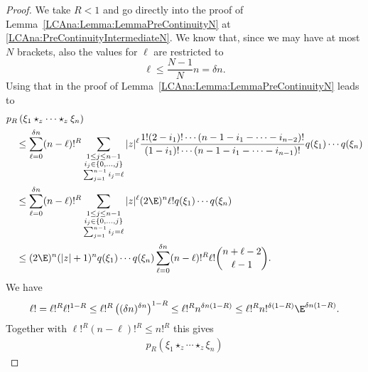 \begin{proof}
    We take $R < 1$ and go directly into the proof of
    Lemma~\ref{LCAna:Lemma:LemmaPreContinuityN} at
    \eqref{LCAna:PreContinuityIntermediateN}. We know that, since we
    may have at most $N$ brackets, also the values for $\ell$ are
    restricted to
    \begin{equation*}
        \ell
        \leq
        \frac{N-1}{N} n
        =
        \delta n.
    \end{equation*}
    Using that in the proof of Lemma~\ref{LCAna:Lemma:LemmaPreContinuityN} 
    leads to
    \begin{align*}
        &p_R \left(
            \xi_1 \star_z \cdots \star_z \xi_n
        \right)
        \\
        &\quad\leq
        \sum\limits_{\ell = 0}^{\delta n}
        (n - \ell)!^R
        \sum\limits_{\substack{
			1 \leq j \leq n-1 \\
			i_j \in \{0, \ldots, j\} \\
			\sum_{j = 1}^{n - 1} i_j = \ell
		}}
        |z|^{\ell}
        \frac{1!  (2 - i_1)! \cdots (n-1 - i_1 - \cdots - i_{n-2})!}
        {(1 - i_1)! \cdots (n-1 - i_1 - \cdots - i_{n-1})!}
        q(\xi_1) \cdots q(\xi_n)
        \\
        &\quad\leq
        \sum\limits_{\ell = 0}^{\delta n}
        (n - \ell)!^R
        \sum\limits_{\substack{
			1 \leq j \leq n-1 \\
			i_j \in \{0, \ldots, j\} \\
			\sum_{j = 1}^{n - 1} i_j = \ell
		}}
        |z|^{\ell} (2 \E)^n \ell!
        q(\xi_1) \cdots q(\xi_n)
        \\
        &\quad\leq
        (2 \E)^n (|z| + 1)^n
        q(\xi_1) \cdots q(\xi_n)
        \sum\limits_{\ell = 0}^{\delta n}
        (n - \ell)!^R \ell!
        \binom{n + \ell - 2}{\ell - 1}.
    \end{align*}
    We have
    \begin{equation*}
        \ell!
        =
        \ell!^R
        \ell!^{1-R}
        \leq
        \ell!^R
        \left(
            (\delta n)^{\delta n}
        \right)^{1-R}
        \leq
        \ell!^R
        n^{\delta n (1-R)}
        \leq
        \ell!^R
        n!^{\delta (1 - R)}
        \E^{\delta n (1 - R)}.
    \end{equation*}
    Together with $\ell!^R (n - \ell)!^R \leq n!^R$ this gives
    \begin{align*}
        p_R \left(
            \xi_1 \star_z \cdots \star_z \xi_n
        \right)

\end{align*}
\end{proof}
